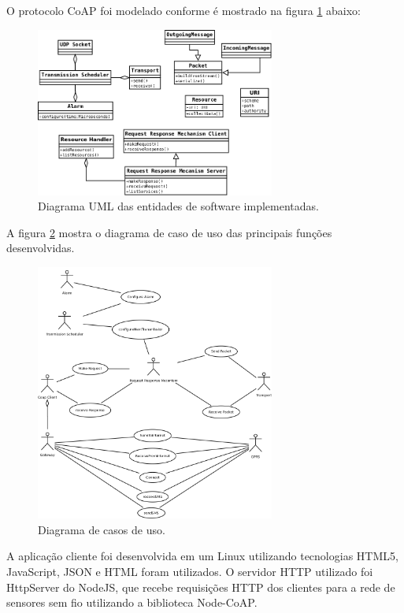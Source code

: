 O protocolo CoAP foi modelado conforme \'e mostrado na figura \ref{uml} abaixo:
\begin{figure}[H]
   \label{uml}
   \centering
   \includegraphics[width=0.7\textwidth]{figuras/uml.png}
   \caption{Diagrama UML das entidades de software implementadas.}
\end{figure}

A figura \ref{casodeuso} mostra o diagrama de caso de uso das principais fun\c{c}\~oes desenvolvidas.
\begin{figure}[H]
   \label{casodeuso}
   \centering
   \includegraphics[width=0.7\textwidth]{figuras/casodeuso.png}
   \caption{Diagrama de casos de uso.}
\end{figure}

A aplica\c{c}\~ao cliente foi desenvolvida em um Linux utilizando tecnologias HTML5, JavaScript, JSON e HTML foram utilizados. O servidor HTTP utilizado foi HttpServer do NodeJS, que recebe requisi\c{c}\~oes HTTP dos clientes para a rede de sensores sem fio utilizando a biblioteca Node-CoAP.

